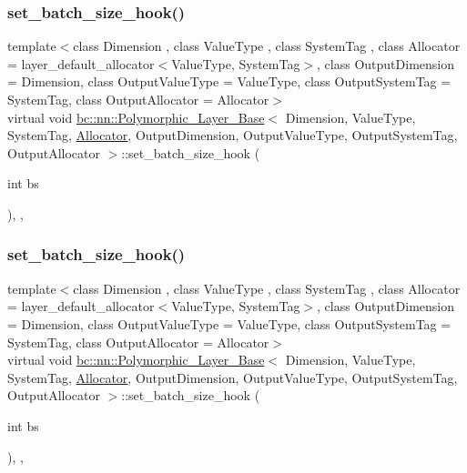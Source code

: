 \subsubsection{\texorpdfstring{set\+\_\+batch\+\_\+size\+\_\+hook()}{set\_batch\_size\_hook()}\hspace{0.1cm}{\footnotesize\ttfamily [1/2]}}
{\footnotesize\ttfamily template$<$class Dimension , class Value\+Type , class System\+Tag , class Allocator  = layer\+\_\+default\+\_\+allocator$<$\+Value\+Type, System\+Tag$>$, class Output\+Dimension  = Dimension, class Output\+Value\+Type  = Value\+Type, class Output\+System\+Tag  = System\+Tag, class Output\+Allocator  = Allocator$>$ \\
virtual void \hyperlink{structbc_1_1nn_1_1Polymorphic__Layer__Base}{bc\+::nn\+::\+Polymorphic\+\_\+\+Layer\+\_\+\+Base}$<$ Dimension, Value\+Type, System\+Tag, \hyperlink{classbc_1_1allocators_1_1Allocator}{Allocator}, Output\+Dimension, Output\+Value\+Type, Output\+System\+Tag, Output\+Allocator $>$\+::set\+\_\+batch\+\_\+size\+\_\+hook (\begin{DoxyParamCaption}\item[{int}]{bs }\end{DoxyParamCaption})\hspace{0.3cm}{\ttfamily [inline]}, {\ttfamily [protected]}, {\ttfamily [virtual]}}

\mbox{\label{structbc_1_1nn_1_1Polymorphic__Layer__Base_a21d145beb5e9f571e5e474171d47dff6}} 
\subsubsection{\texorpdfstring{set\+\_\+batch\+\_\+size\+\_\+hook()}{set\_batch\_size\_hook()}\hspace{0.1cm}{\footnotesize\ttfamily [2/2]}}
{\footnotesize\ttfamily template$<$class Dimension , class Value\+Type , class System\+Tag , class Allocator  = layer\+\_\+default\+\_\+allocator$<$\+Value\+Type, System\+Tag$>$, class Output\+Dimension  = Dimension, class Output\+Value\+Type  = Value\+Type, class Output\+System\+Tag  = System\+Tag, class Output\+Allocator  = Allocator$>$ \\
virtual void \hyperlink{structbc_1_1nn_1_1Polymorphic__Layer__Base}{bc\+::nn\+::\+Polymorphic\+\_\+\+Layer\+\_\+\+Base}$<$ Dimension, Value\+Type, System\+Tag, \hyperlink{classbc_1_1allocators_1_1Allocator}{Allocator}, Output\+Dimension, Output\+Value\+Type, Output\+System\+Tag, Output\+Allocator $>$\+::set\+\_\+batch\+\_\+size\+\_\+hook (\begin{DoxyParamCaption}\item[{int}]{bs }\end{DoxyParamCaption})\hspace{0.3cm}{\ttfamily [inline]}, {\ttfamily [protected]}, {\ttfamily [virtual]}}

